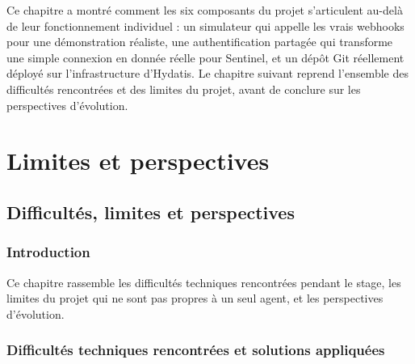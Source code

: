 \documentclass[12pt,a4paper]{report}
\begin{document}
Ce chapitre a montré comment les six composants du projet s'articulent au-delà de leur fonctionnement individuel : un simulateur qui appelle les vrais webhooks pour une démonstration réaliste, une authentification partagée qui transforme une simple connexion en donnée réelle pour Sentinel, et un dépôt Git réellement déployé sur l'infrastructure d'Hydatis. Le chapitre suivant reprend l'ensemble des difficultés rencontrées et des limites du projet, avant de conclure sur les perspectives d'évolution.

\part{Limites et perspectives}

\chapter{Difficultés, limites et perspectives}

\section{Introduction}

Ce chapitre rassemble les difficultés techniques rencontrées pendant le stage, les limites du projet qui ne sont pas propres à un seul agent, et les perspectives d'évolution.

\section{Difficultés techniques rencontrées et solutions appliquées}
\end{document}

